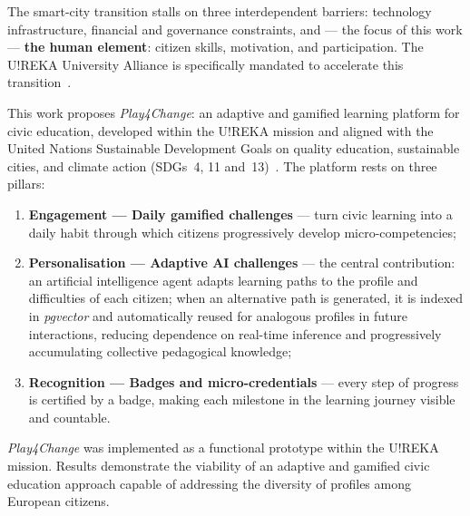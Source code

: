 \abstractEN %

The smart-city transition stalls on three interdependent barriers: technology infrastructure,
financial and governance constraints, and --- the focus of this work --- \textbf{the human
element}: citizen skills, motivation, and participation. The U!REKA University Alliance is
specifically mandated to accelerate this transition~\cite{ureka2024}.

This work proposes \textit{Play4Change}: an adaptive and gamified learning platform for civic
education, developed within the U!REKA mission and aligned with the United Nations Sustainable
Development Goals on quality education, sustainable cities, and climate action
(SDGs~4, 11 and~13)~\cite{un2015sdg}.
The platform rests on three pillars:

\begin{enumerate}
  \item \textbf{Engagement --- Daily gamified challenges} --- turn civic learning into a
        daily habit through which citizens progressively develop micro-competencies;

  \item \textbf{Personalisation --- Adaptive AI challenges} --- the central contribution:
        an artificial intelligence agent adapts learning paths to the profile and difficulties
        of each citizen; when an alternative path is generated, it is indexed in
        \textit{pgvector} and automatically reused for analogous profiles in future
        interactions, reducing dependence on real-time inference and progressively
        accumulating collective pedagogical knowledge;

  \item \textbf{Recognition --- Badges and micro-credentials} --- every step of progress is
        certified by a badge, making each milestone in the learning journey visible and
        countable.
\end{enumerate}

\textit{Play4Change} was implemented as a functional prototype within the U!REKA mission. Results demonstrate the viability of an adaptive and gamified civic education approach capable of addressing the diversity of profiles among European citizens.
